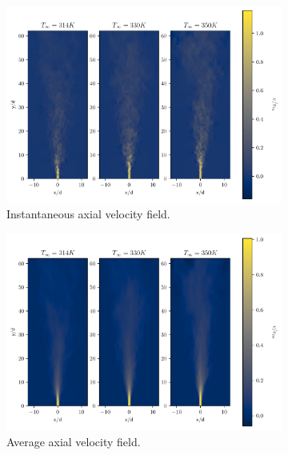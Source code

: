 \begin{figure}[H]
\begin{subfigure}{0.5\textwidth}
	\centering
	\includegraphics[scale=.45]{figures/Plots/vertical/v_scaled_vert_all.pdf}
	\caption{Instantaneous axial velocity field.} \label{all_v_1}
\end{subfigure}
\hfill
\begin{subfigure}{0.5\textwidth}
	\centering
	\includegraphics[scale=.45]{figures/Plots/vertical/v_scaled_vert_avg_all.pdf}
	\caption{Average axial velocity field.} \label{all_v_2}
\end{subfigure}
\vfill
\centering
\begin{subfigure}{0.5\textwidth}

\end{subfigure}
\end{figure}
